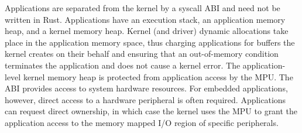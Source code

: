 Applications are separated from the kernel by a syscall ABI and need not be
written in Rust. Applications have an execution stack, an application memory
heap, and a kernel memory heap. Kernel (and driver) dynamic allocations take
place in the application memory space, thus charging applications for buffers
the kernel creates on their behalf and ensuring that an out-of-memory
condition terminates the application and does not cause a kernel error. The
application-level kernel memory heap is protected from application access by the
MPU.
%
The ABI provides access to system hardware resources. For embedded applications,
however, direct access to a hardware peripheral is often required.
Applications can request direct ownership, in which case the kernel uses the
MPU to grant the application access to the memory mapped I/O region of
specific peripherals.





%


